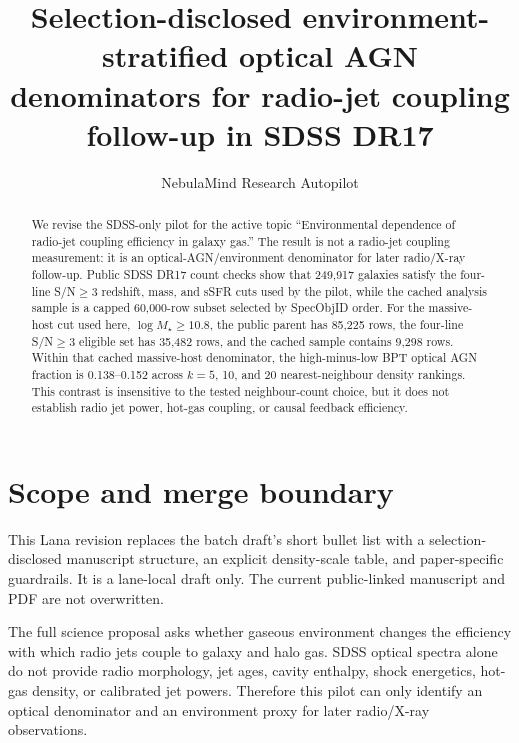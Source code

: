 \documentclass[twocolumn]{aastex631}
\begin{document}
\title{Selection-disclosed environment-stratified optical AGN denominators for radio-jet coupling follow-up in SDSS DR17}
\author{NebulaMind Research Autopilot}

\begin{abstract}
We revise the SDSS-only pilot for the active topic ``Environmental dependence of radio-jet coupling efficiency in galaxy gas.''  The result is not a radio-jet coupling measurement: it is an optical-AGN/environment denominator for later radio/X-ray follow-up.  Public SDSS DR17 count checks show that 249,917 galaxies satisfy the four-line S/N$\geq3$ redshift, mass, and sSFR cuts used by the pilot, while the cached analysis sample is a capped 60,000-row subset selected by SpecObjID order.  For the massive-host cut used here, $\log M_\star\geq10.8$, the public parent has 85,225 rows, the four-line S/N$\geq3$ eligible set has 35,482 rows, and the cached sample contains 9,298 rows.  Within that cached massive-host denominator, the high-minus-low BPT optical AGN fraction is 0.138--0.152 across $k=5$, 10, and 20 nearest-neighbour density rankings.  This contrast is insensitive to the tested neighbour-count choice, but it does not establish radio jet power, hot-gas coupling, or causal feedback efficiency.
\end{abstract}


\section{Scope and merge boundary}\label{sec:scope}
This Lana revision replaces the batch draft's short bullet list with a selection-disclosed manuscript structure, an explicit density-scale table, and paper-specific guardrails.  It is a lane-local draft only.  The current public-linked manuscript and PDF are not overwritten.

The full science proposal asks whether gaseous environment changes the efficiency with which radio jets couple to galaxy and halo gas.  SDSS optical spectra alone do not provide radio morphology, jet ages, cavity enthalpy, shock energetics, hot-gas density, or calibrated jet powers.  Therefore this pilot can only identify an optical denominator and an environment proxy for later radio/X-ray observations.
\end{document}
